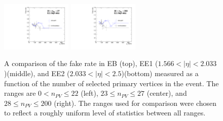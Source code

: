 \begin{figure}[!htbp]
\includegraphics[width=0.3\textwidth]{fig/compare_pv_EE2_2016_23to27.pdf}
\includegraphics[width=0.3\textwidth]{fig/compare_pv_EE2_2016_28to200.pdf}
\caption{A comparison of the fake rate in EB (top), EE1 ($1.566 < |\eta| < 2.033$)(middle), and EE2 ($2.033 < \lvert \eta \rvert< 2.5$)(bottom) measured as a function of the number of selected primary vertices in the event. The ranges are $0 < n_{PV} \leq 22$ (left), $23 \leq n_{PV} \leq 27$ (center), and $28 \leq n_{PV} \leq 200$ (right). The ranges used for comparison were chosen to reflect a roughly uniform level of statistics between all ranges.}
\label{fig:frpileup_compare_dataset_2016}
\end{figure}

